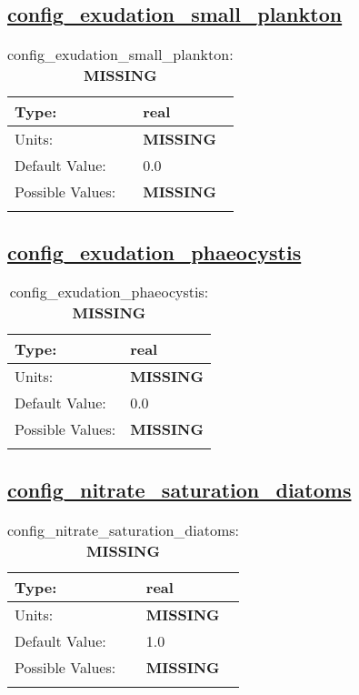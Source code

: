 \subsection[config\_exudation\_small\_plankton]{\hyperref[sec:nm_tab_biogeochemistry]{config\_exudation\_small\_plankton}}
\label{subsec:nm_sec_config_exudation_small_plankton}
\begin{center}
\begin{longtable}{| p{2.0in} || p{4.0in} |}
    \hline
    Type: & real \\
    \hline
    Units: & {\bf \color{red} MISSING} \\
    \hline
    Default Value: & 0.0 \\
    \hline
    Possible Values: & {\bf \color{red} MISSING} \\
    \hline
    \caption{config\_exudation\_small\_plankton: {\bf \color{red} MISSING}}
\end{longtable}
\end{center}
\subsection[config\_exudation\_phaeocystis]{\hyperref[sec:nm_tab_biogeochemistry]{config\_exudation\_phaeocystis}}
\label{subsec:nm_sec_config_exudation_phaeocystis}
\begin{center}
\begin{longtable}{| p{2.0in} || p{4.0in} |}
    \hline
    Type: & real \\
    \hline
    Units: & {\bf \color{red} MISSING} \\
    \hline
    Default Value: & 0.0 \\
    \hline
    Possible Values: & {\bf \color{red} MISSING} \\
    \hline
    \caption{config\_exudation\_phaeocystis: {\bf \color{red} MISSING}}
\end{longtable}
\end{center}
\subsection[config\_nitrate\_saturation\_diatoms]{\hyperref[sec:nm_tab_biogeochemistry]{config\_nitrate\_saturation\_diatoms}}
\label{subsec:nm_sec_config_nitrate_saturation_diatoms}
\begin{center}
\begin{longtable}{| p{2.0in} || p{4.0in} |}
    \hline
    Type: & real \\
    \hline
    Units: & {\bf \color{red} MISSING} \\
    \hline
    Default Value: & 1.0 \\
    \hline
    Possible Values: & {\bf \color{red} MISSING} \\
    \hline
    \caption{config\_nitrate\_saturation\_diatoms: {\bf \color{red} MISSING}}
\end{longtable}
\end{center}
